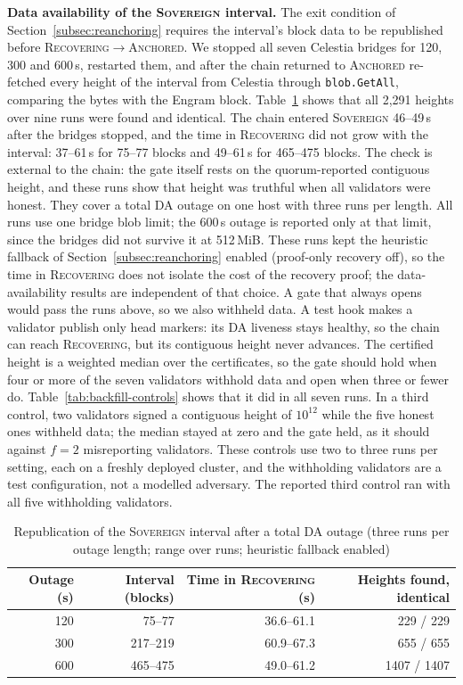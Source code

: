 \textbf{Data availability of the \textsc{Sovereign} interval.} The exit
condition of Section~\ref{subsec:reanchoring} requires the interval's block
data to be republished before \textsc{Recovering}$\to$\textsc{Anchored}. We
stopped all seven Celestia bridges for 120, 300 and 600\,s, restarted them, and
after the chain returned to \textsc{Anchored} re-fetched every height of the
interval from Celestia through \texttt{blob.GetAll}, comparing the bytes with
the Engram block. Table~\ref{tab:backfill} shows that all 2{,}291 heights over
nine runs were found and identical. The chain entered \textsc{Sovereign}
46--49\,s after the bridges stopped, and the time in \textsc{Recovering} did
not grow with the interval: 37--61\,s for 75--77 blocks and 49--61\,s for
465--475 blocks. The check is external to the chain: the gate itself rests on the
quorum-reported contiguous height, and these runs show that height was truthful
when all validators were honest. They cover a total DA outage on one host
with three runs per length. All runs use one bridge blob limit; the 600\,s outage is reported only at that limit, since the bridges did not survive it at 512\,MiB.
These runs kept the heuristic fallback of Section~\ref{subsec:reanchoring}
enabled (proof-only recovery off), so the time in \textsc{Recovering} does not
isolate the cost of the recovery proof; the data-availability results are
independent of that choice.
A gate that always opens would pass the runs above, so we also withheld
data. A test hook makes a validator publish only head markers: its DA liveness
stays healthy, so the chain can reach \textsc{Recovering}, but its contiguous
height never advances. The certified height is a weighted median over the
certificates, so the gate should hold when four or more of the seven
validators withhold data and open when three or fewer do. Table~\ref{tab:backfill-controls}
shows that it did in all seven runs. In a third control, two validators signed
a contiguous height of $10^{12}$ while the five honest ones withheld data; the
median stayed at zero and the gate held, as it should against $f{=}2$
misreporting validators. These controls use two to three runs per setting, each
on a freshly deployed cluster, and the withholding validators are a test
configuration, not a modelled adversary. The reported third control ran with all five withholding validators.

\begin{table}[tbp]
\caption{Republication of the \textsc{Sovereign} interval after a total DA
outage (three runs per outage length; range over runs; heuristic fallback enabled)}
\label{tab:backfill}
\centering
\footnotesize
\begin{tabular}{@{}rrrr@{}}
\toprule
\textbf{Outage (s)} & \textbf{Interval (blocks)} & \textbf{Time in \textsc{Recovering} (s)} & \textbf{Heights found, identical} \\
\midrule
120 & 75--77 & 36.6--61.1 & 229 / 229 \\
300 & 217--219 & 60.9--67.3 & 655 / 655 \\
600 & 465--475 & 49.0--61.2 & 1407 / 1407 \\
\bottomrule
\end{tabular}
\end{table}


